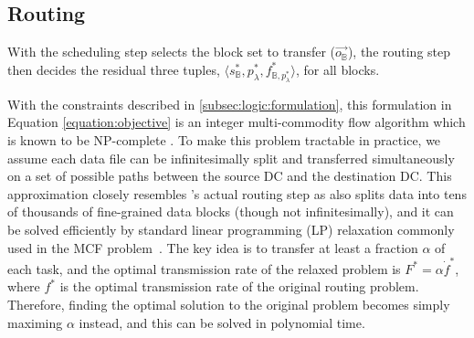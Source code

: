 \subsection{Routing}
\label{subsec:logic:routing}

With the scheduling step selects the block set to transfer ($\overrightarrow{o_\mathbb{B}}$), the routing step then decides the residual three tuples, $\langle s_{\mathbb{B}}^*, p_{\lambda}^*, f^*_{\mathbb{B},p_{\lambda}^*} \rangle$, for all blocks.%

With the constraints described in \Section\ref{subsec:logic:formulation}, this formulation in Equation \ref{equation:objective} is an integer multi-commodity flow algorithm which is known to be NP-complete \cite{garg1997primal}.
To make this problem tractable in practice,
we assume each data file can be infinitesimally split and transferred simultaneously on a set of possible paths between the source DC and the destination DC.
This approximation closely resembles \name's actual routing step as \name also splits data into tens of thousands of fine-grained data blocks (though not infinitesimally), and it can be solved efficiently by standard linear programming (LP) relaxation commonly used in the MCF problem~\cite{garg2007faster,reed2012traffic}.
The key idea is to transfer at least a fraction $\alpha$ of each task,%
and the optimal transmission rate of the relaxed problem is $F^*=\alpha\dot f^*$, where $f^*$ is the optimal transmission rate of the original routing problem.
Therefore, finding the optimal solution to the original problem becomes simply maximing $\alpha$ instead, and this can be solved in polynomial time.

